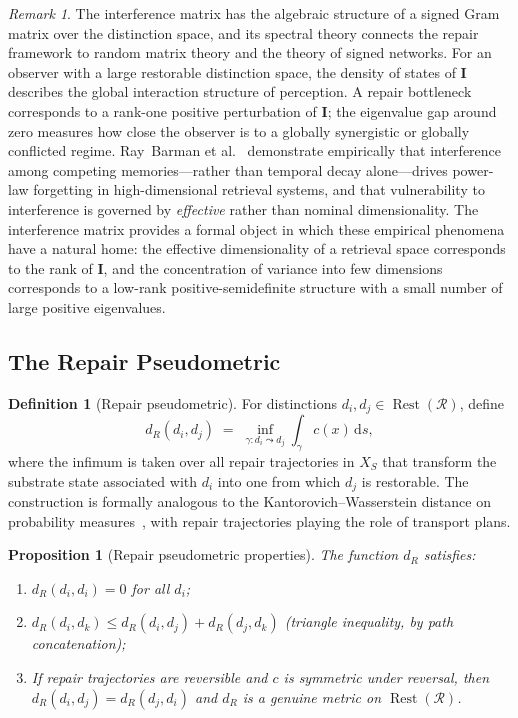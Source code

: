 \documentclass[12pt, oneside]{article}
\theoremstyle{plain}
\newtheorem{proposition}[theorem]{Proposition}
\theoremstyle{definition}
\newtheorem{definition}[theorem]{Definition}
\theoremstyle{remark}
\newtheorem{remark}[theorem]{Remark}
\theoremstyle{definition}
\DeclareMathOperator{\Rest}{Rest}
\newcommand{\IntMat}{\mathbf{I}}
\newcommand{\Xsub}{X_S}
\begin{document}
\begin{remark}
  The interference matrix has the algebraic structure of a signed
  Gram matrix over the distinction space, and its spectral theory
  connects the repair framework to random matrix theory and
  the theory of signed networks.
  For an observer with a large restorable distinction space, the
  density of states of $\IntMat$ describes the global interaction
  structure of perception.
  A repair bottleneck corresponds to a rank-one positive perturbation
  of $\IntMat$; the eigenvalue gap around zero measures how close
  the observer is to a globally synergistic or globally conflicted
  regime.
  Ray~Barman et al.~\cite{RayBarman2026} demonstrate empirically that
  interference among competing memories---rather than temporal decay
  alone---drives power-law forgetting in high-dimensional retrieval
  systems, and that vulnerability to interference is governed by
  \emph{effective} rather than nominal dimensionality.
  The interference matrix provides a formal object in which these
  empirical phenomena have a natural home: the effective dimensionality
  of a retrieval space corresponds to the rank of $\IntMat$, and the
  concentration of variance into few dimensions corresponds to a
  low-rank positive-semidefinite structure with a small number of
  large positive eigenvalues.
\end{remark}

\subsection{The Repair Pseudometric}

\begin{definition}[Repair pseudometric]
  For distinctions $d_i, d_j \in \Rest(\mathcal{R})$, define
  \[
    d_R(d_i, d_j)
    \;=\;
    \inf_{\gamma : d_i \leadsto d_j}
    \int_{\gamma} c(x)\, \mathrm{d}s,
  \]
  where the infimum is taken over all repair trajectories in
  $\Xsub$ that transform the substrate state associated with
  $d_i$ into one from which $d_j$ is restorable.
  The construction is formally analogous to the Kantorovich--Wasserstein
  distance on probability measures~\cite{Villani2009}, with repair
  trajectories playing the role of transport plans.
\end{definition}

\begin{proposition}[Repair pseudometric properties]
  The function $d_R$ satisfies:
  \begin{enumerate}
    \item $d_R(d_i, d_i) = 0$ for all $d_i$;
    \item $d_R(d_i, d_k) \leq d_R(d_i, d_j) + d_R(d_j, d_k)$
      (triangle inequality, by path concatenation);
    \item If repair trajectories are reversible and $c$ is symmetric
      under reversal, then $d_R(d_i, d_j) = d_R(d_j, d_i)$ and
      $d_R$ is a genuine metric on $\Rest(\mathcal{R})$.
  \end{enumerate}
  \label{prop:metric}
\end{proposition}
\end{document}
